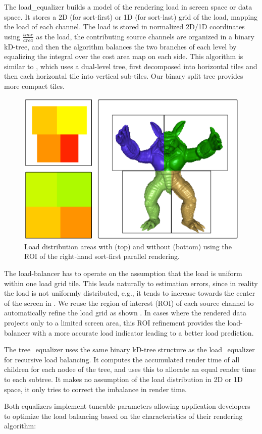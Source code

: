 The \textsf{load\_equalizer} builds a model of the rendering load in screen
space or data space. It stores a 2D (for sort-first) or 1D (for sort-last) grid
of the load, mapping the load of each channel. The load is stored in normalized
2D/1D coordinates using $\frac{time}{area}$ as the load, the contributing source
channels are organized in a binary kD-tree, and then the algorithm balances the
two branches of each level by equalizing the integral over the cost area map on
each side. This algorithm is similar to \cite{ACCC:04}, which uses a dual-level
tree, first decomposed into horizontal tiles and then each horizontal tile into
vertical sub-tiles. Our binary split tree provides more compact tiles.

\begin{figure}
  \includegraphics[width=.382\textwidth]{images/roi}
  \caption{Load distribution areas with (top) and without (bottom) using the ROI
    of the right-hand sort-first parallel rendering.}
  \label{fROI}
\end{figure}

The load-balancer has to operate on the assumption that the load is uniform
within one load grid tile. This leads naturally to estimation errors, since in
reality the load is not uniformly distributed, e.g., it tends to increase
towards the center of the screen in . We reuse the region of interest
(ROI) of each source channel to automatically refine the load grid as shown
. In cases where the rendered data projects only to a limited screen
area, this ROI refinement provides the load-balancer with a more accurate load
indicator leading to a better load prediction.

The \textsf{tree\_equalizer} uses the same binary kD-tree structure as the
\textsf{load\_equalizer} for recursive load balancing. It computes the
accumulated render time of all children for each nodee of the tree, and uses
this to allocate an equal render time to each subtree. It makes no assumption of
the load distribution in 2D or 1D space, it only tries to correct the imbalance
in render time.

Both equalizers implement tuneable parameters allowing application developers to
optimize the load balancing based on the characteristics of their rendering
algorithm:

